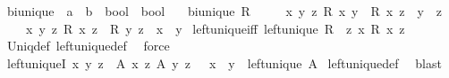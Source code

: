 \begin{isabellebody}
\isanewline
{}\isamarkupfalse%
\ bi{\isacharunderscore}{\kern0pt}unique\ {\isacharcolon}{\kern0pt}{\isacharcolon}{\kern0pt}\ {\isachardoublequoteopen}{\isacharparenleft}{\kern0pt}{\isacharprime}{\kern0pt}a\ {\isasymRightarrow}\ {\isacharprime}{\kern0pt}b\ {\isasymRightarrow}\ bool{\isacharparenright}{\kern0pt}\ {\isasymRightarrow}\ bool{\isachardoublequoteclose}\isanewline
\ \ \ {\isachardoublequoteopen}bi{\isacharunderscore}{\kern0pt}unique\ R\ {\isasymlongleftrightarrow}\isanewline
\ \ \ \ {\isacharparenleft}{\kern0pt}{\isasymforall}x\ y\ z{\isachardot}{\kern0pt}\ R\ x\ y\ {\isasymlongrightarrow}\ R\ x\ z\ {\isasymlongrightarrow}\ y\ {\isacharequal}{\kern0pt}\ z{\isacharparenright}{\kern0pt}\ {\isasymand}\isanewline
\ \ \ \ {\isacharparenleft}{\kern0pt}{\isasymforall}x\ y\ z{\isachardot}{\kern0pt}\ R\ x\ z\ {\isasymlongrightarrow}\ R\ y\ z\ {\isasymlongrightarrow}\ x\ {\isacharequal}{\kern0pt}\ y{\isacharparenright}{\kern0pt}{\isachardoublequoteclose}\isanewline
\isanewline
{}\isamarkupfalse%
\ left{\isacharunderscore}{\kern0pt}unique{\isacharunderscore}{\kern0pt}iff{\isacharcolon}{\kern0pt}\ {\isachardoublequoteopen}left{\isacharunderscore}{\kern0pt}unique\ R\ {\isasymlongleftrightarrow}\ {\isacharparenleft}{\kern0pt}{\isasymforall}z{\isachardot}{\kern0pt}\ {\isasymexists}\isactrlsub {\isasymle}x{\isachardot}{\kern0pt}\ R\ x\ z{\isacharparenright}{\kern0pt}{\isachardoublequoteclose}\isanewline
%
\isadelimproof
\ \ %
\endisadelimproof
%
\isatagproof
{}\isamarkupfalse%
\ Uniq{\isacharunderscore}{\kern0pt}def\ left{\isacharunderscore}{\kern0pt}unique{\isacharunderscore}{\kern0pt}def\ \isamarkupfalse%
\ force%
\endisatagproof
{\isafoldproof}%
%
\isadelimproof
\isanewline
%
\endisadelimproof
\isanewline
{}\isamarkupfalse%
\ left{\isacharunderscore}{\kern0pt}uniqueI{\isacharcolon}{\kern0pt}\ {\isachardoublequoteopen}{\isacharparenleft}{\kern0pt}{\isasymAnd}x\ y\ z{\isachardot}{\kern0pt}\ {\isasymlbrakk}\ A\ x\ z{\isacharsemicolon}{\kern0pt}\ A\ y\ z\ {\isasymrbrakk}\ {\isasymLongrightarrow}\ x\ {\isacharequal}{\kern0pt}\ y{\isacharparenright}{\kern0pt}\ {\isasymLongrightarrow}\ left{\isacharunderscore}{\kern0pt}unique\ A{\isachardoublequoteclose}\isanewline
%
\isadelimproof
%
\endisadelimproof
%
\isatagproof
{}\isamarkupfalse%
\ left{\isacharunderscore}{\kern0pt}unique{\isacharunderscore}{\kern0pt}def\ \isamarkupfalse%
\ blast%
\endisatagproof
{\isafoldproof}%
%
\isadelimproof
\isanewline
%
\endisadelimproof

\end{isabellebody}
